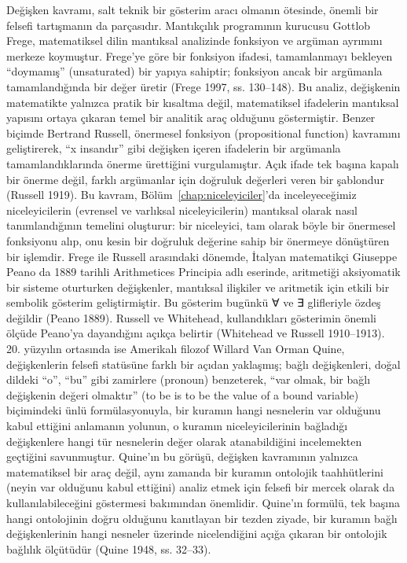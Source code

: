 Değişken kavramı, salt teknik bir gösterim aracı olmanın ötesinde, önemli bir felsefi tartışmanın da parçasıdır. Mantıkçılık programının kurucusu Gottlob Frege, matematiksel dilin mantıksal analizinde fonksiyon ve argüman ayrımını merkeze koymuştur. Frege’ye göre bir fonksiyon ifadesi, tamamlanmayı bekleyen “doymamış” (unsaturated) bir yapıya sahiptir; fonksiyon ancak bir argümanla tamamlandığında bir değer üretir (Frege 1997, ss. 130–148). Bu analiz, değişkenin matematikte yalnızca pratik bir kısaltma değil, matematiksel ifadelerin mantıksal yapısını ortaya çıkaran temel bir analitik araç olduğunu göstermiştir. Benzer biçimde Bertrand Russell, önermesel fonksiyon (propositional function) kavramını geliştirerek, “x insandır” gibi değişken içeren ifadelerin bir argümanla tamamlandıklarında önerme ürettiğini vurgulamıştır. Açık ifade tek başına kapalı bir önerme değil, farklı argümanlar için doğruluk değerleri veren bir şablondur (Russell 1919). Bu kavram, Bölüm~\ref{chap:niceleyiciler}’da inceleyeceğimiz niceleyicilerin (evrensel ve varlıksal niceleyicilerin) mantıksal olarak nasıl tanımlandığının temelini oluşturur: bir niceleyici, tam olarak böyle bir önermesel fonksiyonu alıp, onu kesin bir doğruluk değerine sahip bir önermeye dönüştüren bir işlemdir. Frege ile Russell arasındaki dönemde, İtalyan matematikçi Giuseppe Peano da 1889 tarihli Arithmetices Principia adlı eserinde, aritmetiği aksiyomatik bir sisteme oturturken değişkenler, mantıksal ilişkiler ve aritmetik için etkili bir sembolik gösterim geliştirmiştir. Bu gösterim bugünkü ∀ ve ∃ glifleriyle özdeş değildir (Peano 1889). Russell ve Whitehead, kullandıkları gösterimin önemli ölçüde Peano’ya dayandığını açıkça belirtir (Whitehead ve Russell 1910–1913). 20. yüzyılın ortasında ise Amerikalı filozof Willard Van Orman Quine, değişkenlerin felsefi statüsüne farklı bir açıdan yaklaşmış; bağlı değişkenleri, doğal dildeki “o”, “bu” gibi zamirlere (pronoun) benzeterek, “var olmak, bir bağlı değişkenin değeri olmaktır” (to be is to be the value of a bound variable) biçimindeki ünlü formülasyonuyla, bir kuramın hangi nesnelerin var olduğunu kabul ettiğini anlamanın yolunun, o kuramın niceleyicilerinin bağladığı değişkenlere hangi tür nesnelerin değer olarak atanabildiğini incelemekten geçtiğini savunmuştur. Quine’ın bu görüşü, değişken kavramının yalnızca matematiksel bir araç değil, aynı zamanda bir kuramın ontolojik taahhütlerini (neyin var olduğunu kabul ettiğini) analiz etmek için felsefi bir mercek olarak da kullanılabileceğini göstermesi bakımından önemlidir. Quine’ın formülü, tek başına hangi ontolojinin doğru olduğunu kanıtlayan bir tezden ziyade, bir kuramın bağlı değişkenlerinin hangi nesneler üzerinde nicelendiğini açığa çıkaran bir ontolojik bağlılık ölçütüdür (Quine 1948, ss. 32–33).

